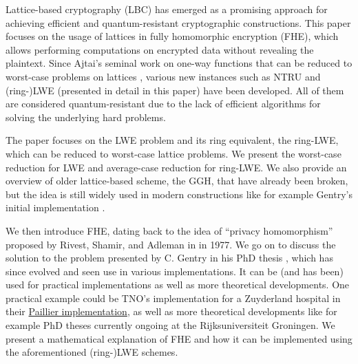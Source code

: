 \iffalse
This bachelor thesis can be seen as a survey on the recent developments in the LBC and improvements in fully homomorphic cryptographic schemes. Nonetheless, there are few minor contributions that we note here.

Firstly, and most importantly, the introduction of many examples that we hope will be of great help for anyone trying to learn and understand LBC schemes. These include comptutations as well as images and tables that help visualize some key concepts related to Gaussian samples or lattices.

Secondly, we present and explicitly state few results that are otherwise left simply as claims or propositions. These mostly include parts on the algebraic number theory for the Section \ref{ring-lwe} on ring-LWE.
\fi

Lattice-based cryptography (LBC) has emerged as a promising approach for achieving efficient and quantum-resistant cryptographic constructions. This paper focuses on the usage of lattices in fully homomorphic encryption (FHE), which allows performing computations on encrypted data without revealing the plaintext. Since Ajtai's seminal work on one-way functions that can be reduced to worst-case problems on lattices \cite{ajtai}, various new instances such as NTRU \cite{ntru} and (ring-)LWE \cite{regev, ring-lwe} (presented in detail in this paper) have been developed. All of them are considered quantum-resistant due to the lack of efficient algorithms for solving the underlying hard problems.

The paper focuses on the LWE problem and its ring equivalent, the ring-LWE, which can be reduced to worst-case lattice problems. We present the worst-case reduction for LWE and average-case reduction for ring-LWE. We also provide an overview of older lattice-based scheme, the GGH, that have already been broken, but the idea is still widely used in modern constructions like for example Gentry's initial implementation \cite{gentry_phd}.

We then introduce FHE, dating back to the idea of ``privacy homomorphism'' proposed by Rivest, Shamir, and Adleman in \cite{primal} in 1977. We go on to discuss the solution to the problem presented by C. Gentry in his PhD thesis \cite{gentry_phd}, which has since evolved and seen use in various implementations. It can be (and has been) used for practical implementations as well as more theoretical developments. One practical example could be TNO's implementation for a Zuyderland hospital in their \href{https://eprint.iacr.org/2019/1136.pdf}{Paillier implementation}, as well as more theoretical developments like for example PhD theses currently ongoing at the Rijksuniversiteit Groningen. We present a mathematical explanation of FHE and how it can be implemented using the aforementioned (ring-)LWE schemes.


